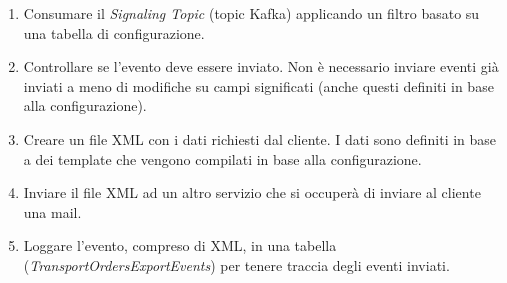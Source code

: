 \begin{enumerate}
    \item Consumare il \textit{Signaling Topic} (topic Kafka) applicando un filtro basato su una tabella di configurazione.
    \item Controllare se l'evento deve essere inviato. Non è necessario inviare eventi già inviati a meno di modifiche su campi significati 
    (anche questi definiti in base alla configurazione).
    \item Creare un file XML con i dati richiesti dal cliente. I dati sono definiti in base a dei template che vengono compilati in base alla configurazione.
    \item Inviare il file XML ad un altro servizio che si occuperà di inviare al cliente una mail.
    \item Loggare l'evento, compreso di XML, in una tabella (\textit{TransportOrdersExportEvents}) per tenere traccia degli eventi inviati.
\end{enumerate}


